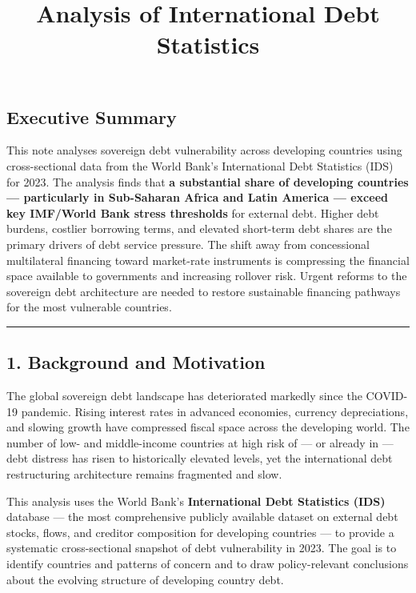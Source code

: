 \documentclass[
  letterpaper,
  DIV=11,
  numbers=noendperiod]{scrartcl}
\title{Analysis of International Debt Statistics}
\author{}
\date{}
\begin{document}
\maketitle


\subsection{Executive Summary}\label{executive-summary}

This note analyses sovereign debt vulnerability across developing
countries using cross-sectional data from the World Bank's International
Debt Statistics (IDS) for 2023. The analysis finds that \textbf{a
substantial share of developing countries --- particularly in
Sub-Saharan Africa and Latin America --- exceed key IMF/World Bank
stress thresholds} for external debt. Higher debt burdens, costlier
borrowing terms, and elevated short-term debt shares are the primary
drivers of debt service pressure. The shift away from concessional
multilateral financing toward market-rate instruments is compressing the
financial space available to governments and increasing rollover risk.
Urgent reforms to the sovereign debt architecture are needed to restore
sustainable financing pathways for the most vulnerable countries.

\begin{center}\rule{0.5\linewidth}{0.5pt}\end{center}

\subsection{1. Background and
Motivation}\label{background-and-motivation}

The global sovereign debt landscape has deteriorated markedly since the
COVID-19 pandemic. Rising interest rates in advanced economies, currency
depreciations, and slowing growth have compressed fiscal space across
the developing world. The number of low- and middle-income countries at
high risk of --- or already in --- debt distress has risen to
historically elevated levels, yet the international debt restructuring
architecture remains fragmented and slow.

This analysis uses the World Bank's \textbf{International Debt
Statistics (IDS)} database --- the most comprehensive publicly available
dataset on external debt stocks, flows, and creditor composition for
developing countries --- to provide a systematic cross-sectional
snapshot of debt vulnerability in 2023. The goal is to identify
countries and patterns of concern and to draw policy-relevant
conclusions about the evolving structure of developing country debt.
\end{document}
